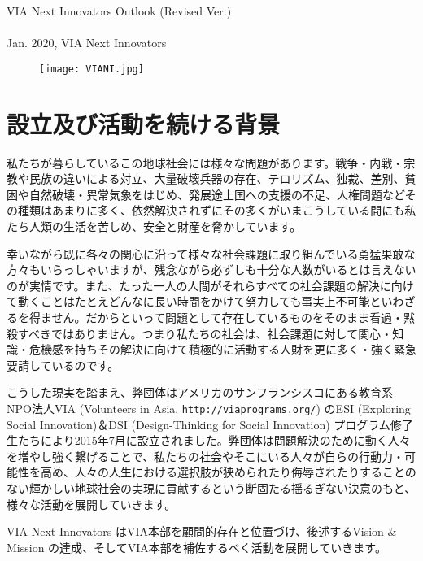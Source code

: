 \documentclass[dvipdfmx,11pt]{jsarticle}
\begin{document}
\begin{titlepage}
\begin{center}
\vspace*{130truept}
{\LARGE VIA Next Innovators Outlook (Revised Ver.)}\\
\vspace{20truept}
\\
\vspace{20truept}
{\Large Jan. 2020, VIA Next Innovators}\\
\vspace{20truept}
\begin{figure}[h]
\texttt{[image: VIANI.jpg]}
\end{figure}

\end{center}
\end{titlepage}
\thispagestyle{empty}
\tableofcontents
\newpage
\section{設立及び活動を続ける背景}
私たちが暮らしているこの地球社会には様々な問題があります。戦争・内戦・宗教や民族の違いによる対立、大量破壊兵器の存在、テロリズム、独裁、差別、貧困や自然破壊・異常気象をはじめ、発展途上国への支援の不足、人権問題などその種類はあまりに多く、依然解決されずにその多くがいまこうしている間にも私たち人類の生活を苦しめ、安全と財産を脅かしています。
\par
幸いながら既に各々の関心に沿って様々な社会課題に取り組んでいる勇猛果敢な方々もいらっしゃいますが、残念ながら必ずしも十分な人数がいるとは言えないのが実情です。また、たった一人の人間がそれらすべての社会課題の解決に向けて動くことはたとえどんなに長い時間をかけて努力しても事実上不可能といわざるを得ません。だからといって問題として存在しているものをそのまま看過・黙殺すべきではありません。つまり私たちの社会は、社会課題に対して関心・知識・危機感を持ちその解決に向けて積極的に活動する人財を更に多く・強く緊急要請しているのです。
\par
こうした現実を踏まえ、弊団体はアメリカのサンフランシスコにある教育系NPO法人VIA (Volunteers in Asia, \texttt{http://viaprograms.org/}) のESI (Exploring Social Innovation)＆DSI (Design-Thinking for Social Innovation) プログラム修了生たちにより2015年7月に設立されました。弊団体は問題解決のために動く人々を増やし強く繋げることで、私たちの社会やそこにいる人々が自らの行動力・可能性を高め、人々の人生における選択肢が狭められたり侮辱されたりすることのない輝かしい地球社会の実現に貢献するという断固たる揺るぎない決意のもと、様々な活動を展開していきます。
\par
VIA Next Innovators はVIA本部を顧問的存在と位置づけ、後述するVision \& Mission の達成、そしてVIA本部を補佐するべく活動を展開していきます。
\end{document}
